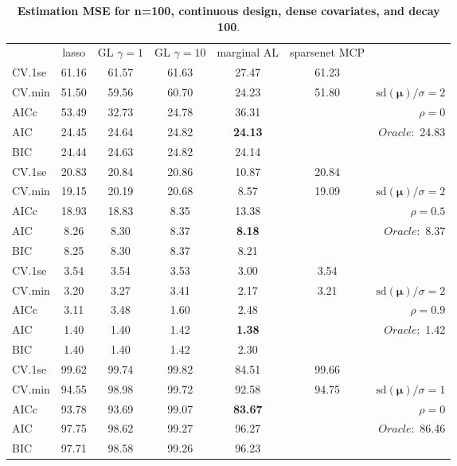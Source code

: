\begin{table}\vspace{-.5cm}
\caption[l]{ { \bf Estimation MSE for n=100, continuous design, 
dense covariates, and  decay  100}.}
\vspace{-.5cm}
\footnotesize{}
\begin{center}
\begin{tabular}{l*{5}{c}|r}
& lasso & GL $\gamma=1$ & GL $\gamma=10$ & marginal AL & sparsenet MCP  & \\
 \cline{1-7}
CV.1se & 61.16 & 61.57 & 61.63 & 27.47 & 61.23 & \\
CV.min & 51.50 & 59.56 & 60.70 & 24.23 & 51.80 &  $\mathrm{sd}(\mathbf{\mu})/\sigma=2$ \\
AICc & 53.49 & 32.73 & 24.78 & 36.31 & & $\rho=0$ \\
AIC & 24.45 & 24.64 & 24.82 & {\bf 24.13} & &  \multirow{2}{*}{$Oracle: $ 24.83} \\
BIC & 24.44 & 24.63 & 24.82 & 24.14 & &  \\
 \hline 
CV.1se & 20.83 & 20.84 & 20.86 & 10.87 & 20.84 & \\
CV.min & 19.15 & 20.19 & 20.68 & 8.57 & 19.09 &  $\mathrm{sd}(\mathbf{\mu})/\sigma=2$ \\
AICc & 18.93 & 18.83 & 8.35 & 13.38 & & $\rho=0.5$ \\
AIC & 8.26 & 8.30 & 8.37 & {\bf 8.18} & &  \multirow{2}{*}{$Oracle: $ 8.37} \\
BIC & 8.25 & 8.30 & 8.37 & 8.21 & &  \\
 \hline 
CV.1se & 3.54 & 3.54 & 3.53 & 3.00 & 3.54 & \\
CV.min & 3.20 & 3.27 & 3.41 & 2.17 & 3.21 &  $\mathrm{sd}(\mathbf{\mu})/\sigma=2$ \\
AICc & 3.11 & 3.48 & 1.60 & 2.48 & & $\rho=0.9$ \\
AIC & 1.40 & 1.40 & 1.42 & {\bf 1.38} & &  \multirow{2}{*}{$Oracle: $ 1.42} \\
BIC & 1.40 & 1.40 & 1.42 & 2.30 & &  \\
 \hline 
CV.1se & 99.62 & 99.74 & 99.82 & 84.51 & 99.66 & \\
CV.min & 94.55 & 98.98 & 99.72 & 92.58 & 94.75 &  $\mathrm{sd}(\mathbf{\mu})/\sigma=1$ \\
AICc & 93.78 & 93.69 & 99.07 & {\bf 83.67} & & $\rho=0$ \\
AIC & 97.75 & 98.62 & 99.27 & 96.27 & &  \multirow{2}{*}{$Oracle: $ 86.46} \\
BIC & 97.71 & 98.58 & 99.26 & 96.23 & &  \\

\end{tabular}
\end{center}
\end{table}
